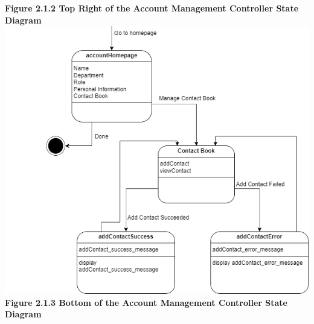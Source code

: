 \documentclass[]{article}
\begin{document}
\begin{center}
	\textbf{Figure 2.1.2 Top Right of the Account Management Controller State Diagram}
	\includegraphics{../images/ControllerStateDiagrams/AMCBottom.png}
	\textbf{Figure 2.1.3 Bottom of the Account Management Controller State Diagram}


\end{center}
\end{document}
